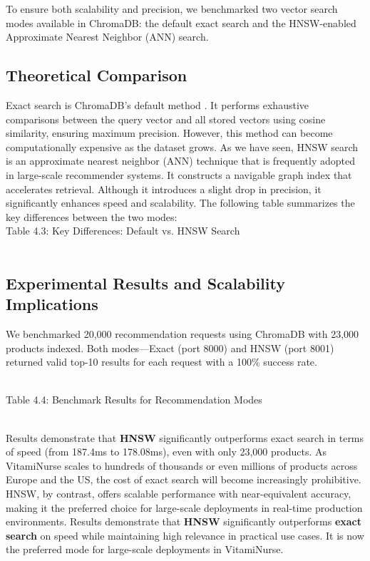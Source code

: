 To ensure both scalability and precision, we benchmarked two vector
search modes available in ChromaDB: the default exact search and the
HNSW-enabled Approximate Nearest Neighbor (ANN) search.
\subsection{Theoretical Comparison}
Exact search is ChromaDB’s default method . It performs exhaustive
comparisons between the query vector and all stored vectors using cosine
similarity, ensuring maximum precision. However, this method can
become computationally expensive as the dataset grows.
As we have seen, HNSW search is an approximate nearest neighbor
(ANN) technique that is frequently adopted in large-scale recommender
systems. It constructs a navigable graph index that accelerates retrieval.
Although it introduces a slight drop in precision, it significantly enhances
speed and scalability.
The following table summarizes the key differences between the two
modes:
\\

Table 4.3: Key Differences: Default vs. HNSW Search
\\
\\

\subsection{Experimental Results and Scalability Implications}
We benchmarked 20,000 recommendation requests using ChromaDB with
23,000 products indexed. Both modes—Exact (port 8000) and HNSW
(port 8001) returned valid top-10 results for each request with a 100\%
success rate.

\\
Table 4.4: Benchmark Results for Recommendation Modes

\\
Results demonstrate that \textbf{HNSW} significantly outperforms exact search
in terms of speed (from 187.4ms to 178.08ms), even with only 23,000
products. As VitamiNurse scales to hundreds of thousands or even
millions of products across Europe and the US, the cost of exact search
will become increasingly prohibitive.
HNSW, by contrast, offers scalable performance with near-equivalent
accuracy, making it the preferred choice for large-scale deployments in
real-time production environments.
Results demonstrate that \textbf{HNSW} significantly outperforms \textbf{exact
search} on speed while maintaining high relevance in practical use cases.
It is now the preferred mode for large-scale deployments in VitamiNurse.

